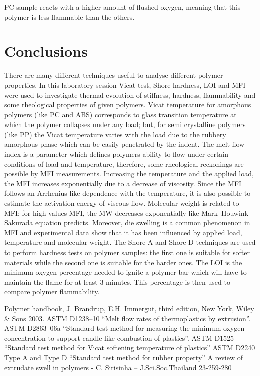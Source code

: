 \documentclass[a4paper, 11pt]{article}
\begin{document}
PC sample reacts with a higher amount of flushed oxygen, meaning that this polymer is less flammable than the others.
 
\section{Conclusions}

There are many different techniques useful to analyse different polymer properties. In this laboratory session Vicat test, Shore hardness, LOI and MFI were used to investigate thermal evolution of stiffness, hardness, flammability and some rheological properties of given polymers.
Vicat temperature for amorphous polymers (like PC and ABS) corresponds to glass transition temperature at which the polymer collapses under any load; but, for semi crystalline polymers (like PP) the Vicat temperature varies with the load due to the rubbery amorphous phase which can be easily penetrated by the indent.
The melt flow index is a parameter which defines polymers ability to flow under certain conditions of load and temperature, therefore, some rheological reckonings are possible by MFI measurements. Increasing the temperature and the applied load, the MFI increases exponentially due to a decrease of viscosity. Since the MFI follows an Arrhenius-like dependence with the temperature, it is also possible to estimate the activation energy of viscous flow. Molecular weight is related to MFI: for high values MFI, the MW decreases exponentially like Mark–Houwink–Sakurada equation predicts. Moreover, die swelling is a common phenomenon in MFI and experimental data show that it has been influenced by applied load, temperature and molecular weight.
The Shore A and Shore D techniques are used to perform hardness tests on polymer samples: the first one is suitable for softer materials while the second one is suitable for the harder ones.
The LOI is the minimum oxygen percentage needed to ignite a polymer bar which will have to maintain the flame for at least 3 minutes. This percentage is then used to compare polymer flammability.

\newpage

\thispagestyle{empty}

\begin{thebibliography}{1}

 Polymer handbook, J. Brandrup, E.H. Immergut, third edition, New York, Wiley \& Sons 2003.
 ASTM D1238–10 “Melt flow rates of thermoplastics by extrusion”. 
 ASTM D2863–06a “Standard test method for measuring the minimum oxygen concentration to support candle-like combustion of plastics”.
 ASTM D1525 “Standard test method for Vicat softening temperature of plastics”
 ASTM D2240 Type A and Type D “Standard test method for rubber property”
 A review of extrudate swell in polymers - C. Sirisinha – J.Sci.Soc.Thailand 23-259-280

\end{thebibliography}
\end{document}
